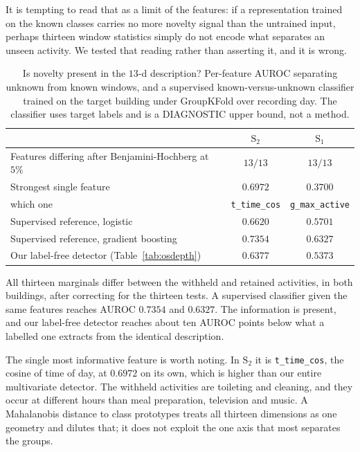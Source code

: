 It is tempting to read that as a limit of the features: if a representation trained on the
known classes carries no more novelty signal than the untrained input, perhaps thirteen
window statistics simply do not encode what separates an unseen activity. We tested that
reading rather than asserting it, and it is wrong.

\begin{table}[t]
\centering
\caption{Is novelty present in the $13$-d description? Per-feature AUROC separating
unknown from known windows, and a supervised known-versus-unknown classifier trained on
the target building under GroupKFold over recording day. The classifier uses target
labels and is a DIAGNOSTIC upper bound, not a method.}
\label{tab:osceiling}
\small
\begin{tabular}{@{}lcc@{}}
\toprule
 & $\text{S}_2$ & $\text{S}_1$ \\
\midrule
Features differing after Benjamini-Hochberg at $5\%$ & $13/13$ & $13/13$ \\
Strongest single feature & $0.6972$ & $0.3700$ \\
\quad which one & \texttt{t\_time\_cos} & \texttt{g\_max\_active} \\
Supervised reference, logistic & $0.6620$ & $0.5701$ \\
Supervised reference, gradient boosting & $\mathbf{0.7354}$ & $\mathbf{0.6327}$ \\
\midrule
Our label-free detector (Table~\ref{tab:osdepth}) & $0.6377$ & $0.5373$ \\
\bottomrule
\end{tabular}
\end{table}

All thirteen marginals differ between the withheld and retained activities, in both
buildings, after correcting for the thirteen tests. A supervised classifier given the same
features reaches AUROC $0.7354$ and $0.6327$. The information is present, and our
label-free detector reaches about ten AUROC points below what a labelled one extracts from
the identical description.

The single most informative feature is worth noting. In $\text{S}_2$ it is
\texttt{t\_time\_cos}, the cosine of time of day, at $0.6972$ on its own, which is higher
than our entire multivariate detector. The withheld activities are toileting and cleaning,
and they occur at different hours than meal preparation, television and music. A
Mahalanobis distance to class prototypes treats all thirteen dimensions as one geometry
and dilutes that; it does not exploit the one axis that most separates the groups.

